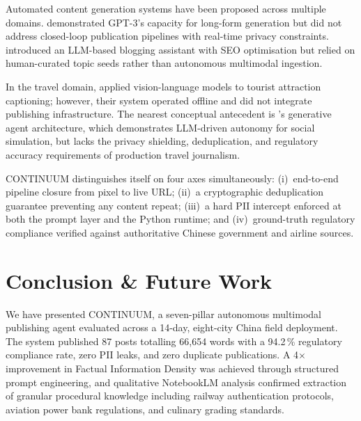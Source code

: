 \documentclass[conference]{IEEEtran}
\begin{document}
Automated content generation systems have been proposed across multiple
domains. \citet{Brown2020} demonstrated GPT-3's capacity for long-form
generation but did not address closed-loop publication pipelines with
real-time privacy constraints. \citet{Wu2023} introduced an LLM-based
blogging assistant with SEO optimisation but relied on human-curated
topic seeds rather than autonomous multimodal ingestion.

In the travel domain, \citet{Majumdar2024} applied vision-language models
to tourist attraction captioning; however, their system operated offline
and did not integrate publishing infrastructure. The nearest conceptual
antecedent is \citet{Park2023}'s generative agent architecture, which
demonstrates LLM-driven autonomy for social simulation, but lacks the
privacy shielding, deduplication, and regulatory accuracy requirements
of production travel journalism.

\textsc{CONTINUUM} distinguishes itself on four axes simultaneously:
(i)~end-to-end pipeline closure from pixel to live URL;
(ii)~a cryptographic deduplication guarantee preventing any content repeat;
(iii)~a hard PII intercept enforced at both the prompt layer and the
Python runtime; and (iv)~ground-truth regulatory compliance verified against
authoritative Chinese government and airline sources.

\section{Conclusion \& Future Work}
\label{sec:conclusion}

We have presented \textsc{CONTINUUM}, a seven-pillar autonomous multimodal
publishing agent evaluated across a 14-day, eight-city China field deployment.
The system published 87 posts totalling 66{,}654 words with a 94.2\,\%
regulatory compliance rate, zero PII leaks, and zero duplicate publications.
A 4$\times$ improvement in Factual Information Density was achieved through
structured prompt engineering, and qualitative NotebookLM analysis confirmed
extraction of granular procedural knowledge including railway authentication
protocols, aviation power bank regulations, and culinary grading standards.
\end{document}
